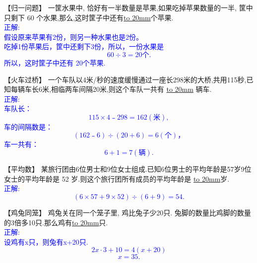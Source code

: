 
\item {
    【归一问题】
    一筐水果中, 恰好有一半数量是苹果,如果吃掉苹果数量的一半, 筐中只剩下 60 个水果,那么,这时筐子中还有\underline{\hbox to 20mm{}}个苹果.
    \ifshowSolution{}
        \fangsong{}\textcolor{blue}{
            \\正解:\\
            假设原来苹果有2份，则另一种水果也是2份。\\
            吃掉1份苹果后，筐中还剩下3份，所以，一份水果是
            \[
                60\div 3 = 20个.
            \]
            所以，这时筐子中还有 20个苹果.
        }
    \else
        \vspace{2cm}
    \fi
}

\item {
    【火车过桥】
    一个车队以4米/秒的速度缓慢通过一座长298米的大桥,共用115秒,已知每辆车长6米,相临两车间隔20米,则这个车队一共有 \underline{\hbox to 20mm{}} 辆车.
    \ifshowSolution{}
        \fangsong{}\textcolor{blue}{
            \\正解:\\
            车队长：\[115\times 4﹣298=162 (米), \]
            车的间隔数是：\[(162﹣6)\div (20+6)=6(个)，\]
            车一共有：\[ 6+1 = 7(辆).\]
        }
    \else
        \vspace{2cm}
    \fi
}

\item {
    【平均数】
    某旅行团由6位男士和9位女士组成.已知6位男士的平均年龄是57岁9位女士的平均年龄是 52 岁.则这个旅行团所有成员的平均年龄是 \underline{\hbox to 20mm{}}岁.
    \ifshowSolution{}
        \fangsong{}\textcolor{blue}{
            \\正解:\\
            \[(6\times 57 + 9\times 52)\div (6+9)=54.\]
        }
    \else
        \vspace{2cm}
    \fi
}

\item {
    【鸡兔同笼】
    鸡兔关在同一个笼子里, 鸡比兔子少20只. 兔脚的数量比鸡脚的数量的3倍多10只.那么鸡有\underline{\hbox to 20mm{}}只. 
    \ifshowSolution{}
        \fangsong{}\textcolor{blue}{
            \\正解:\\
            设鸡有x只，则兔有x+20只.
            \[2x\cdot 3 + 10 = 4(x+20)\]
            \[x = 35.\]
        }
    \else
        \vspace{2cm}
    \fi
}

